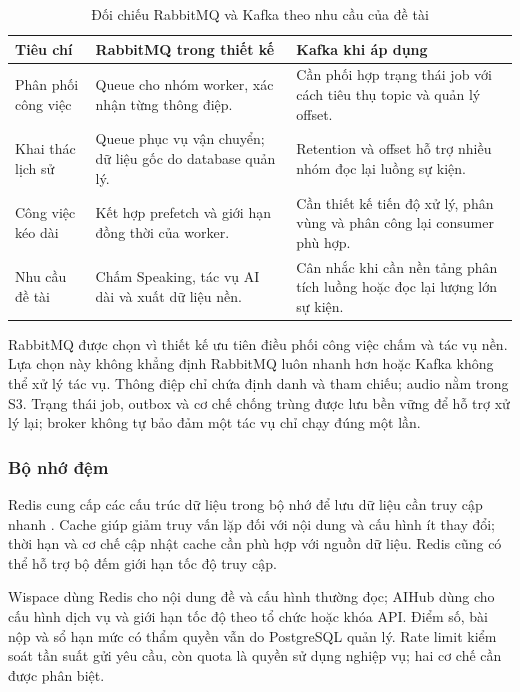 \begin{table}[H]
\centering
\caption{Đối chiếu RabbitMQ và Kafka theo nhu cầu của đề tài}
\label{tech:tab:broker-comparison}
\small
\renewcommand{\arraystretch}{1.2}
\begin{tabularx}{\linewidth}{|>{\raggedright\arraybackslash}X|>{\raggedright\arraybackslash}X|>{\raggedright\arraybackslash}X|}
\hline
\textbf{Tiêu chí} & \textbf{RabbitMQ trong thiết kế} & \textbf{Kafka khi áp dụng} \\ \hline
Phân phối công việc & Queue cho nhóm worker, xác nhận từng thông điệp. & Cần phối hợp trạng thái job với cách tiêu thụ topic và quản lý offset. \\ \hline
Khai thác lịch sử & Queue phục vụ vận chuyển; dữ liệu gốc do database quản lý. & Retention và offset hỗ trợ nhiều nhóm đọc lại luồng sự kiện. \\ \hline
Công việc kéo dài & Kết hợp prefetch và giới hạn đồng thời của worker. & Cần thiết kế tiến độ xử lý, phân vùng và phân công lại consumer phù hợp. \\ \hline
Nhu cầu đề tài & Chấm Speaking, tác vụ AI dài và xuất dữ liệu nền. & Cân nhắc khi cần nền tảng phân tích luồng hoặc đọc lại lượng lớn sự kiện. \\ \hline
\end{tabularx}
\end{table}

RabbitMQ được chọn vì thiết kế ưu tiên điều phối công việc chấm và tác vụ nền. Lựa chọn này không khẳng định RabbitMQ luôn nhanh hơn hoặc Kafka không thể xử lý tác vụ. Thông điệp chỉ chứa định danh và tham chiếu; audio nằm trong S3. Trạng thái job, outbox và cơ chế chống trùng được lưu bền vững để hỗ trợ xử lý lại; broker không tự bảo đảm một tác vụ chỉ chạy đúng một lần.

\subsubsection{Bộ nhớ đệm}

Redis cung cấp các cấu trúc dữ liệu trong bộ nhớ để lưu dữ liệu cần truy cập nhanh \parencite{ch4_redis}. Cache giúp giảm truy vấn lặp đối với nội dung và cấu hình ít thay đổi; thời hạn và cơ chế cập nhật cache cần phù hợp với nguồn dữ liệu. Redis cũng có thể hỗ trợ bộ đếm giới hạn tốc độ truy cập.

Wispace dùng Redis cho nội dung đề và cấu hình thường đọc; AIHub dùng cho cấu hình dịch vụ và giới hạn tốc độ theo tổ chức hoặc khóa API. Điểm số, bài nộp và sổ hạn mức có thẩm quyền vẫn do PostgreSQL quản lý. Rate limit kiểm soát tần suất gửi yêu cầu, còn quota là quyền sử dụng nghiệp vụ; hai cơ chế cần được phân biệt.

